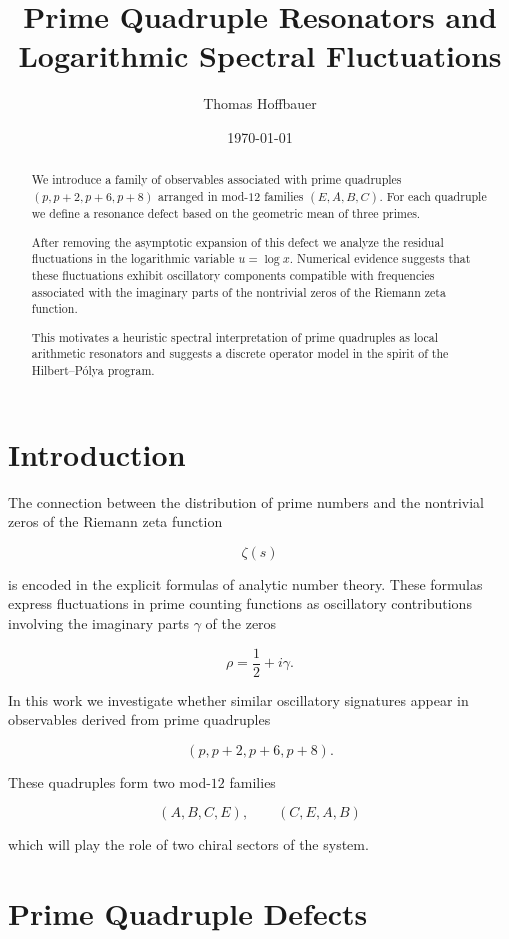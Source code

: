 \documentclass[11pt]{article}
\title{Prime Quadruple Resonators and Logarithmic Spectral Fluctuations}
\author{Thomas Hoffbauer}
\date{\today}
\begin{document}
	
	\maketitle
	
	\begin{abstract}
		
		We introduce a family of observables associated with prime quadruples 
		$(p,p+2,p+6,p+8)$ arranged in mod-$12$ families $(E,A,B,C)$.  
		For each quadruple we define a resonance defect based on the geometric mean of three primes.  
		
		After removing the asymptotic expansion of this defect we analyze the residual fluctuations in the logarithmic variable $u=\log x$.  
		Numerical evidence suggests that these fluctuations exhibit oscillatory components compatible with frequencies associated with the imaginary parts of the nontrivial zeros of the Riemann zeta function.
		
		This motivates a heuristic spectral interpretation of prime quadruples as local arithmetic resonators and suggests a discrete operator model in the spirit of the Hilbert–Pólya program.
		
	\end{abstract}
	
	\section{Introduction}
	
	The connection between the distribution of prime numbers and the nontrivial zeros of the Riemann zeta function
	
	\[
	\zeta(s)
	\]
	
	is encoded in the explicit formulas of analytic number theory.  
	These formulas express fluctuations in prime counting functions as oscillatory contributions involving the imaginary parts $\gamma$ of the zeros
	
	\[
	\rho=\frac12+i\gamma .
	\]
	
	In this work we investigate whether similar oscillatory signatures appear in observables derived from prime quadruples
	
	\[
	(p,p+2,p+6,p+8).
	\]
	
	These quadruples form two mod-$12$ families
	
	\[
	(A,B,C,E),\qquad (C,E,A,B)
	\]
	
	which will play the role of two chiral sectors of the system.
	
	\section{Prime Quadruple Defects}
	
\end{document}
